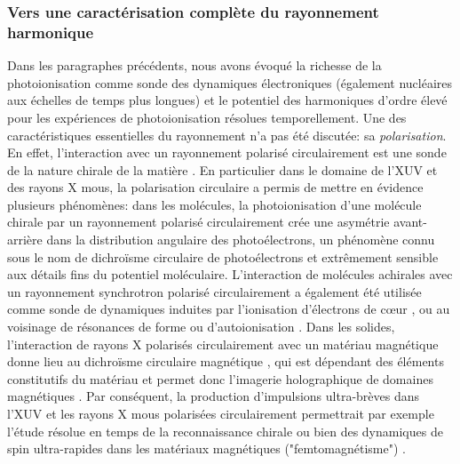 \subsubsection*{Vers une caractérisation complète du rayonnement harmonique}
Dans les paragraphes précédents, nous avons évoqué la richesse de la photoionisation comme sonde des dynamiques électroniques (également nucléaires aux échelles de temps plus longues) et le potentiel des harmoniques d'ordre élevé pour les expériences de photoionisation résolues temporellement. Une des caractéristiques essentielles du rayonnement n'a pas été discutée: sa \textit{polarisation}. En effet, l'interaction avec un rayonnement polarisé circulairement est une sonde de la nature chirale de la matière . En particulier dans le domaine de l'XUV et des rayons X mous, la polarisation circulaire a permis de mettre en évidence plusieurs phénomènes: dans les molécules, la photoionisation d'une molécule chirale par un rayonnement polarisé circulairement crée une asymétrie avant-arrière dans la distribution angulaire des photoélectrons, un phénomène connu sous le nom de dichroïsme circulaire de photoélectrons  et extrêmement sensible aux détails fins du potentiel moléculaire. L'interaction de molécules achirales avec un rayonnement synchrotron polarisé circulairement a également été utilisée comme sonde de dynamiques induites par l'ionisation d'électrons de c\oe ur , ou au voisinage de résonances de forme  ou d'autoionisation . Dans les solides, l'interaction de rayons X polarisés circulairement avec un matériau magnétique donne lieu au dichroïsme circulaire magnétique , qui est dépendant des éléments constitutifs du matériau et permet donc l'imagerie holographique de domaines magnétiques . Par conséquent, la production d'impulsions ultra-brèves dans l'XUV et les rayons X mous polarisées circulairement permettrait par exemple l'étude résolue en temps de la reconnaissance chirale  ou bien des dynamiques de spin ultra-rapides dans les matériaux magnétiques ("femtomagnétisme") .

